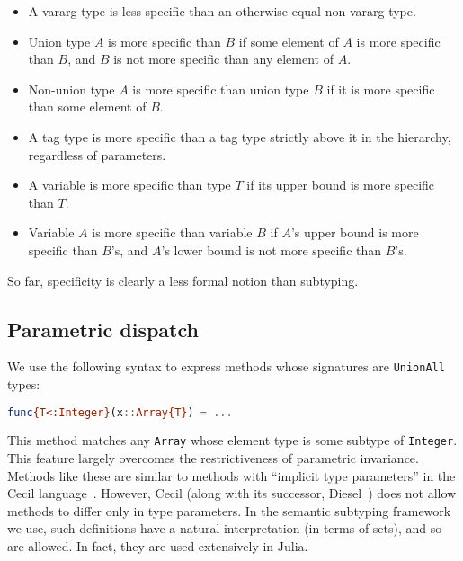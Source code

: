 \begin{itemize}
\item A vararg type is less specific than an otherwise equal non-vararg type.
\item Union type $A$ is more specific than $B$ if some element of $A$ is
more specific than $B$, and $B$ is not more specific than any
element of $A$.
\item Non-union type $A$ is more specific than union type $B$ if it is more specific
than some element of $B$.
\item A tag type is more specific than a tag type strictly above it in the
hierarchy, regardless of parameters.
\item A variable is more specific than type $T$ if its upper bound is more specific
than $T$.
\item Variable $A$ is more specific than variable $B$ if $A$'s upper bound is
more specific than $B$'s, and $A$'s lower bound is not more specific than $B$'s.
\end{itemize}

So far, specificity is clearly a less formal notion than subtyping.

\subsection{Parametric dispatch}

We use the following syntax to express methods whose signatures
are \texttt{UnionAll} types:

\begin{singlespace}
\begin{lstlisting}[language=julia]
func{T<:Integer}(x::Array{T}) = ...
\end{lstlisting}
\end{singlespace}

\noindent
This method matches any \texttt{Array} whose element type is some subtype
of \texttt{Integer}.
This feature largely overcomes the restrictiveness of parametric invariance.
Methods like these are similar to methods with ``implicit type parameters''
in the Cecil language~\cite{cecilspec}.
However, Cecil (along with its successor, Diesel~\cite{chambers2006diesel})
does not allow methods to differ only in type parameters.
In the semantic subtyping framework we use, such definitions have a
natural interpretation (in terms of sets), and so are allowed.
In fact, they are used extensively in Julia.

